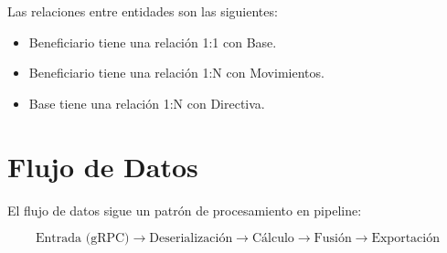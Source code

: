 Las relaciones entre entidades son las siguientes:

\begin{itemize}
    \item Beneficiario tiene una relación 1:1 con Base.
    \item Beneficiario tiene una relación 1:N con Movimientos.
    \item Base tiene una relación 1:N con Directiva.
\end{itemize}

\bigskip

\section{Flujo de Datos}

El flujo de datos sigue un patrón de procesamiento en pipeline:

\[
\text{Entrada (gRPC)} \rightarrow \text{Deserialización} \rightarrow \text{Cálculo} \rightarrow \text{Fusión} \rightarrow \text{Exportación}
\]

\vfill
\newpage

